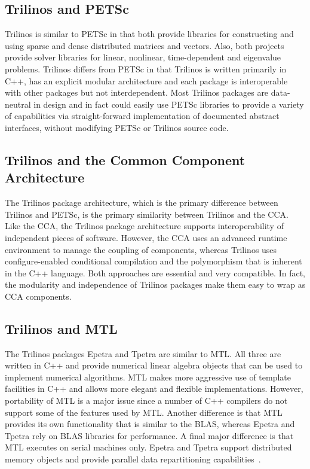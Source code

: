 \documentclass[acmtoms,acmnow]{acmtrans2m}
\begin{document}
\subsection{Trilinos and PETSc}
Trilinos is similar to PETSc in that both provide libraries for
constructing and using sparse and dense distributed matrices and
vectors.  Also, both projects provide solver libraries for linear, nonlinear,
time-dependent and eigenvalue problems.  Trilinos differs from PETSc
in that Trilinos is written primarily in C++, has an explicit
modular architecture and each package is interoperable with other
packages but not interdependent.  Most Trilinos packages are
data-neutral in design and in fact could easily use PETSc libraries to
provide a variety of capabilities via straight-forward implementation
of documented abstract interfaces, without modifying PETSc or Trilinos source code.  

\subsection{Trilinos and the Common Component Architecture}
The Trilinos package architecture, which is the primary difference between
Trilinos and PETSc,
is the primary similarity between Trilinos and the CCA.  Like the CCA,
the Trilinos
package architecture supports interoperability of independent
pieces of software.  However, the CCA uses an advanced runtime
environment to manage the coupling of components, whereas Trilinos
uses configure-enabled conditional compilation and the polymorphism
that is inherent in the C++ language.  Both
approaches are essential and very compatible.  In fact, the modularity
and independence of Trilinos
packages make them easy to wrap as CCA components.

\subsection{Trilinos and MTL}
The Trilinos packages Epetra and Tpetra are similar to MTL.  All three
are written in C++ and provide numerical linear algebra objects
that can be used to implement numerical algorithms.  MTL
makes more aggressive use of template facilities in C++ and allows
more elegant and flexible implementations.  However, portability of
MTL is a major issue since a number of C++ compilers do not 
support some of
the features used by MTL.  Another difference is that MTL provides its
own functionality that is similar to the BLAS, whereas Epetra and
Tpetra rely on BLAS libraries for performance.  A final
major difference is that MTL executes on serial machines only.  
Epetra and Tpetra support distributed
memory objects and provide parallel data repartitioning
capabilities~\cite{Repartitioning}.
\end{document}
